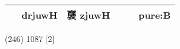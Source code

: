 \documentclass[14pt,a4paper]{scrartcl}
\begin{document}
\begin{longtable}[c]{@{}llllll@{}}
\begin{minipage}[t]{0.14\columnwidth}\raggedright\strut
𥝩
\strut\end{minipage} &
\begin{minipage}[t]{0.14\columnwidth}\raggedright\strut
drjuwH
\strut\end{minipage} &
\begin{minipage}[t]{0.14\columnwidth}\raggedright\strut
褎 zjuwH
\strut\end{minipage} &
\begin{minipage}[t]{0.14\columnwidth}\raggedright\strut
\strut\end{minipage} &
\begin{minipage}[t]{0.14\columnwidth}\raggedright\strut
\strut\end{minipage} &
\begin{minipage}[t]{0.14\columnwidth}\raggedright\strut
pure:B
\strut\end{minipage}\tabularnewline
\bottomrule
\end{longtable}

(246) 1087 {[}2{]}
\end{document}
